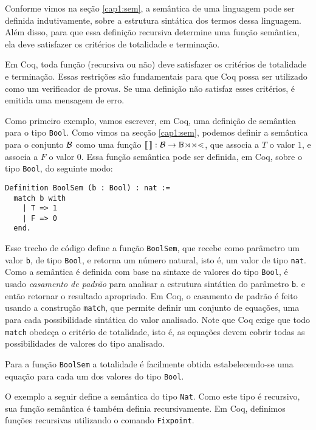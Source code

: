 Conforme vimos na se\c{c}\~ao \ref{cap1:sem}, a sem\^antica de uma linguagem pode ser definida indutivamente, sobre a estrutura sint\'atica dos termos dessa linguagem. Além disso, para que essa defini\c{c}\~ao recursiva determine uma fun\c{c}\~ao semântica, ela deve satisfazer os crit\'erios de totalidade e termina\c{c}\~ao.

Em Coq, toda fun\c{c}\~ao (recursiva ou n\~ao) deve satisfazer os crit\'erios de totalidade e termina\c{c}\~ao. Essas restri\c{c}\~oes s\~ao fundamentais para que Coq possa ser 
utilizado como um verificador de provas. Se uma defini\c{c}\~ao n\~ao satisfaz  esses crit\'erios, é emitida uma mensagem de erro. 

Como primeiro exemplo, vamos escrever, em Coq, uma definição de semântica para o tipo
\texttt{Bool}. Como vimos na sec\c{c}\~ao \ref{cap1:sem}, podemos definir a sem\^antica para o conjunto $\mathcal{B}$ como uma função $\llbracket\,\rrbracket : \mathcal{B} \rightarrow \mathbb{Bool}$, que associa a $T$ o valor $1$, e associa a $F$ o valor $0$.
Essa função semântica pode ser definida, em Coq, sobre o tipo \texttt{Bool}, do seguinte modo:
\begin{lstlisting}
Definition BoolSem (b : Bool) : nat :=
  match b with
    | T => 1
    | F => 0
  end.
\end{lstlisting}
Esse trecho de c\'odigo define a fun\c{c}\~ao \texttt{BoolSem}, que recebe
como par\^ametro um valor \texttt{b}, de tipo \texttt{Bool}, e
retorna um n\'umero natural, isto é, um valor de tipo \texttt{nat}. Como a
sem\^antica é definida com base na sintaxe de valores do tipo \texttt{Bool}, é usado \emph{casamento de padr\~ao\/} para analisar a estrutura sint\'atica do par\^ametro \texttt{b}.  e ent\~ao retornar o resultado apropriado. Em Coq, o casamento de padr\~ao \'e feito usando a constru\c{c}\~ao \texttt{match}, que permite definir um conjunto de equa\c{c}\~oes, uma para cada possibilidade sint\'atica do valor analisado. Note que Coq exige que todo \texttt{match} obede\c{c}a o crit\'erio de totalidade, isto é, as equa\c{c}\~oes devem cobrir todas as possibilidades de valores do tipo analisado.

Para a fun\c{c}\~ao \texttt{BoolSem} a totalidade \'e facilmente obtida estabelecendo-se uma equa\c{c}\~ao para cada um dos valores do tipo \texttt{Bool}.

O exemplo a seguir define a sem\^antica do tipo \texttt{Nat}. Como
este tipo \'e recursivo, sua fun\c{c}\~ao sem\^antica é tamb\'em definia recursivamente.
Em Coq, definimos fun\c{c}\~oes recursivas utilizando o comando \texttt{Fixpoint}.
 
